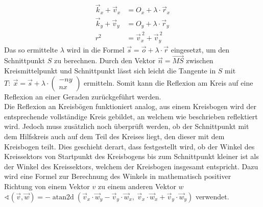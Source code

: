\documentclass[a4paper, 11pt]{scrartcl}
\DeclareMathOperator{\atantwo}{atan2d}
\begin{document}
\begin{equation*}
\begin{split}
\vec{k}_x + \vec{v}_x & = O_x + \lambda\cdot\vec{r}_x\\
\vec{k}_y + \vec{v}_y & = O_y + \lambda\cdot\vec{r}_y\\
r^2 & = \vec{v}_x^{~2} + \vec{v}_y^{~2} 
\end{split}
\end{equation*}
Das so ermittelte $\lambda$ wird in die Formel $\vec{s} = \vec{o} + \lambda \cdot \vec{r}$  eingesetzt, um den Schnittpunkt $S$ zu berechnen. 
Durch den Vektor $\vec{n} = \vec{MS}$ zwischen Kreismittelpunkt und Schnittpunkt lässt sich leicht die Tangente in $S$ mit $T: ~\vec{x} = \vec{s} + \lambda \cdot \begin{pmatrix} -ny \\ nx \end{pmatrix}$ ermitteln.
Somit kann die Reflexion am Kreis auf eine Reflexion an einer Geraden zurückgeführt werden.\\
Die Reflexion an Kreisbögen funktioniert analog, aus einem Kreisbogen wird der entsprechende vollständige Kreis gebildet, an welchem wie beschrieben reflektiert wird. 
Jedoch muss zusätzlich noch überprüft werden, ob der Schnittpunkt mit dem \glqq Hilfskreis\grqq{} auch auf dem Teil des Kreises liegt, den dieser mit dem Kreisbogen teilt. 
Dies geschieht derart, dass festgestellt wird, ob der Winkel des Kreissektors von Startpunkt des Kreisbogens bis zum Schnittpunkt kleiner ist als der Winkel des Kreissektors, welchem der Kreisbogen insgesamt entspricht. 
Dazu wird eine Formel zur Berechnung des Winkels in mathematisch positiver Richtung von einem Vektor $v$ zu einem anderen Vektor $w$ $\sphericalangle(\vec{v}, \vec{w}) = -\atantwo(\vec{v}_x\cdot\vec{w}_y-\vec{v}_y\cdot\vec{w}_x,~\vec{v}_x\cdot\vec{w}_x+\vec{v}_y\cdot\vec{w}_y)$  verwendet.
\par
\end{document}
